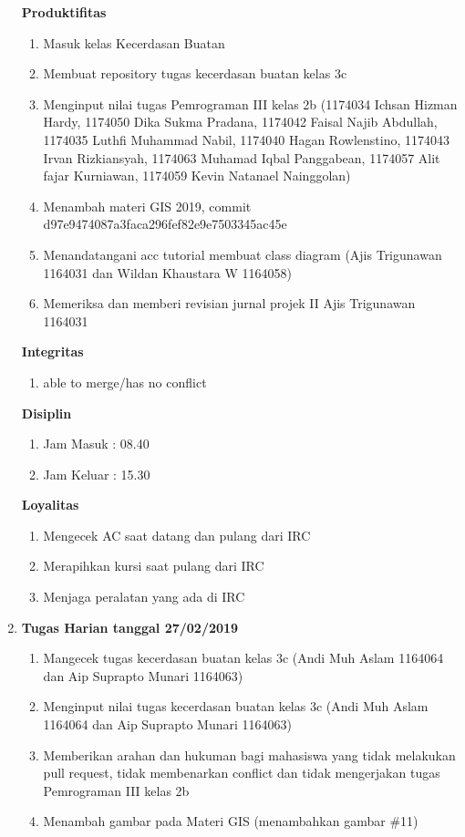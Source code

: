 \begin{enumerate}
\textbf{Produktifitas}
\begin{enumerate}
\item Masuk kelas Kecerdasan Buatan
\item Membuat repository tugas kecerdasan buatan kelas 3c
\item Menginput nilai tugas Pemrograman III kelas 2b (1174034 Ichsan Hizman Hardy, 1174050 Dika Sukma Pradana, 1174042 Faisal Najib Abdullah, 1174035 Luthfi Muhammad Nabil, 1174040 Hagan Rowlenstino, 1174043 Irvan Rizkiansyah, 1174063 Muhamad Iqbal Panggabean, 1174057 Alit fajar Kurniawan, 1174059 Kevin Natanael Nainggolan)
\item Menambah materi GIS 2019, commit d97e9474087a3faca296fef82e9e7503345ac45e
\item Menandatangani acc tutorial membuat class diagram (Ajis Trigunawan 1164031 dan Wildan Khaustara W 1164058)
\item Memeriksa dan memberi revisian jurnal projek II Ajis Trigunawan 1164031
\end{enumerate}

\textbf{Integritas}
\begin{enumerate}
\item able to merge/has no conflict
\end{enumerate}

\textbf{Disiplin}
\begin{enumerate}
\item Jam Masuk : 08.40
\item Jam Keluar : 15.30
\end{enumerate}

\textbf{Loyalitas}
\begin{enumerate}
\item Mengecek AC saat datang dan pulang dari IRC
\item Merapihkan kursi saat pulang dari IRC
\item Menjaga peralatan yang ada di IRC
\end{enumerate}

\item \textbf{Tugas Harian tanggal 27/02/2019}
\begin{enumerate}
\item Mangecek tugas kecerdasan buatan kelas 3c (Andi Muh Aslam 1164064 dan Aip Suprapto Munari 1164063)
\item Menginput nilai tugas kecerdasan buatan kelas 3c (Andi Muh Aslam 1164064 dan Aip Suprapto Munari 1164063)
\item Memberikan arahan dan hukuman bagi mahasiswa yang tidak melakukan pull request, tidak membenarkan conflict dan tidak mengerjakan tugas Pemrograman III kelas 2b
\item Menambah gambar pada Materi GIS (menambahkan gambar \#11) 
\end{enumerate}


\end{enumerate}
